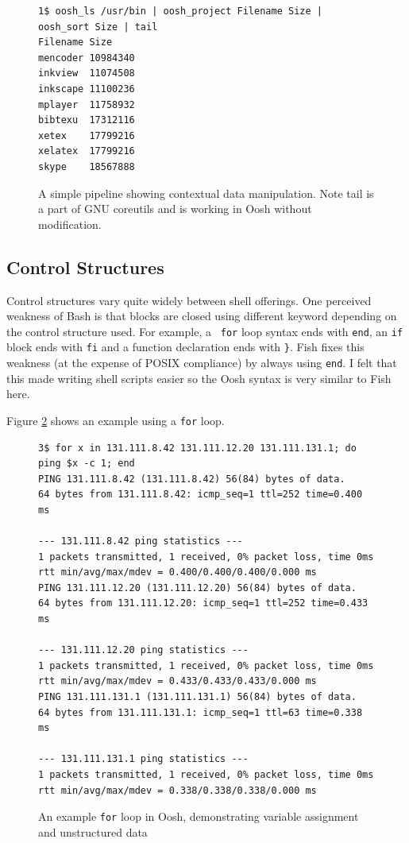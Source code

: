 \documentclass[12pt,twoside,notitlepage]{report}
\begin{document}
\begin{figure}[h]
\begin{verbatim}
1$ oosh_ls /usr/bin | oosh_project Filename Size | oosh_sort Size | tail
Filename Size
mencoder 10984340
inkview  11074508
inkscape 11100236
mplayer  11758932
bibtexu  17312116
xetex    17799216
xelatex  17799216
skype    18567888
\end{verbatim}
\caption{A simple pipeline showing contextual data manipulation. Note tail is a part of
GNU coreutils and is working in Oosh without modification.}
\label{lsexample}
\end{figure}

\subsection{Control Structures}
\label{forexample}

Control structures vary quite widely between shell offerings. One
perceived weakness of Bash is that blocks are closed using different
keyword depending on the control structure used. For example, a {\tt
  for} loop syntax ends with {\tt end}, an {\tt if} block ends with
{\tt fi} and a function declaration ends with {\tt \}}. Fish fixes
this weakness (at the expense of POSIX compliance) by always using
{\tt end}. I felt that this made writing shell scripts easier so the
Oosh syntax is very similar to Fish here.

Figure \ref{forloop} shows an example using a {\tt for} loop.

\begin{figure}[h]
\begin{verbatim}
3$ for x in 131.111.8.42 131.111.12.20 131.111.131.1; do ping $x -c 1; end
PING 131.111.8.42 (131.111.8.42) 56(84) bytes of data.
64 bytes from 131.111.8.42: icmp_seq=1 ttl=252 time=0.400 ms

--- 131.111.8.42 ping statistics ---
1 packets transmitted, 1 received, 0% packet loss, time 0ms
rtt min/avg/max/mdev = 0.400/0.400/0.400/0.000 ms
PING 131.111.12.20 (131.111.12.20) 56(84) bytes of data.
64 bytes from 131.111.12.20: icmp_seq=1 ttl=252 time=0.433 ms

--- 131.111.12.20 ping statistics ---
1 packets transmitted, 1 received, 0% packet loss, time 0ms
rtt min/avg/max/mdev = 0.433/0.433/0.433/0.000 ms
PING 131.111.131.1 (131.111.131.1) 56(84) bytes of data.
64 bytes from 131.111.131.1: icmp_seq=1 ttl=63 time=0.338 ms

--- 131.111.131.1 ping statistics ---
1 packets transmitted, 1 received, 0% packet loss, time 0ms
rtt min/avg/max/mdev = 0.338/0.338/0.338/0.000 ms
\end{verbatim}
\caption{An example {\tt for} loop in Oosh, demonstrating variable
  assignment and unstructured data}
\label{forloop}
\end{figure}
\end{document}
